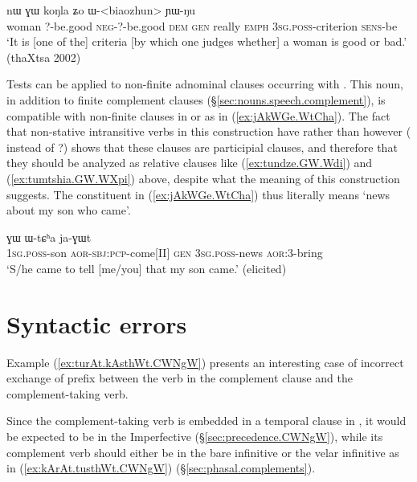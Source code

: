 \begin{exe}
\ex  \label{ex:biaozhun}
\gll   	[tɕʰeme kɯ-pe mɤ-kɯ-pe] nɯ ɣɯ koŋla ʑo ɯ-<biaozhun>   ɲɯ-ŋu   \\
woman ?-be.good \textsc{neg}-?-be.good \textsc{dem} \textsc{gen} really \textsc{emph} \textsc{3sg}.\textsc{poss}-criterion \textsc{sens}-be \\
\glt `It is [one of the] criteria [by which one judges whether] a woman is good or bad.' (thaXtsa 2002)
\end{exe}

Tests can be applied to non-finite adnominal clauses occurring with . This noun, in addition to finite complement clauses (§\ref{sec:nouns.speech.complement}), is compatible with non-finite clauses in  or  as in (\ref{ex:jAkWGe.WtCha}). The fact that non-stative intransitive verbs in this construction have  rather than  however ( instead of ?) shows that these clauses are participial clauses, and therefore that they should be analyzed as relative clauses like (\ref{ex:tundze.GW.Wdi}) and (\ref{ex:tumtshia.GW.WXpi}) above, despite what the meaning of this construction suggests. The constituent  in (\ref{ex:jAkWGe.WtCha}) thus literally means `news about my son who came'.

\begin{exe}
\ex  \label{ex:jAkWGe.WtCha}
\gll  [a-tɕɯ jɤ-kɯ-ɣe] ɣɯ ɯ-tɕʰa ja-ɣɯt\\
\textsc{1sg}.\textsc{poss}-son \textsc{aor}-\textsc{sbj}:\textsc{pcp}-come[II]  \textsc{gen} \textsc{3sg}.\textsc{poss}-news \textsc{aor}:3\flobv{}-bring\\
 \glt `S/he came to tell [me/you] that my son came.' (elicited)
 \end{exe}



\section{Syntactic errors} \label{sec:syntactic.errors}
Example (\ref{ex:turAt.kAsthWt.CWNgW}) presents an interesting case of incorrect exchange of prefix between the verb in the complement clause and the complement-taking verb. 

Since the complement-taking verb  is embedded in a temporal clause in , it would be expected to be in the Imperfective (§\ref{sec:precedence.CWNgW}), while its complement verb should either be in the bare infinitive or the velar infinitive as in (\ref{ex:kArAt.tusthWt.CWNgW}) (§\ref{sec:phasal.complements}).

